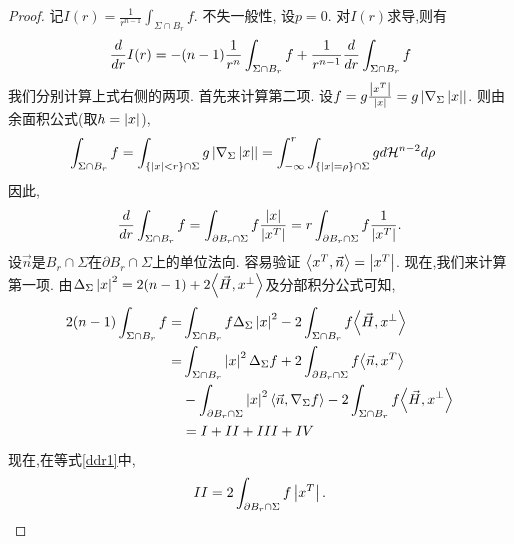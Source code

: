 \begin{proof}
     记$I(r)=\frac{1}{r^{n-1}}\int_{\Sigma\cap B_r} f$. 不失一般性, 设$p=0$. 对$I(r)$求导,则有
     \begin{equation} \label{ddr}
        \frac{d}{dr} I(r)=-(n-1)\frac{1}{r^n}\int_{\Sigma \cap B_r} f + \frac{1}{r^{n-1}}\frac{d}{dr} \int_{\Sigma \cap B_r} f
     \end{equation}
     我们分别计算上式右侧的两项. 首先来计算第二项. 设$f=g\frac{\left | x^T \right |}{\left | x \right |}=g\left | \nabla_\Sigma \left | x \right | \right |$. 则由余面积公式(取$h=\left | x \right |$),
     \begin{equation}
        \begin{split}
            \int_{\Sigma \cap B_r} f = \int_{\{\left | x \right | < r\}\cap \Sigma }g \left | \nabla_\Sigma \left | x \right | \right | &= \int^r_{-\infty} \int_{\{\left | x \right |=\rho\} \cap \Sigma} g d{{\mathcal{H}}}^{n-2}d\rho 
        \end{split}
     \end{equation}
     因此, 
     \begin{equation} \label{ddr2}
        \frac{d}{dr} \int_{\Sigma \cap B_r} f= \int_{\partial B_r \cap \Sigma} f \frac{\left | x \right |}{\left | x^T \right |} =r\int_{\partial B_r\cap \Sigma} f \frac{1}{\left | x^T \right |}.
     \end{equation}
     设$\vec{n}$是$B_r\cap \Sigma$在$\partial B_r\cap \Sigma$上的单位法向. 容易验证 ${\left < x^T, \vec{n} \right >}= \left | x^T \right |$.  现在,我们来计算第一项. 由$\Delta_\Sigma \left | x \right |^2=2(n-1)+2{\left < \vec{H}, x^\perp \right >}$及分部积分公式可知,
     \begin{equation} \label{ddr1}
        \begin{split}
            2(n-1)\int_{\Sigma \cap B_r}f =&\int_{\Sigma \cap B_r}f \Delta_{\Sigma}\left | x \right |^2-2\int_{\Sigma \cap B_r} f{\left < \vec{H}, x^\perp \right >} \\
            =& \int_{\Sigma \cap B_r}\left | x \right |^2 \Delta_\Sigma f + 2\int_{\partial B_r\cap \Sigma}f{\left < \vec{n}, x^T \right >}  \\
            &- \int_{\partial B_r \cap \Sigma}\left | x \right |^2 {\left < \vec{n}, \nabla_{\Sigma}f \right >}-2\int_{\Sigma \cap B_r} f{\left < \vec{H}, x^\perp \right >}\\
            &=I+II+III+IV
        \end{split}
     \end{equation}
     现在,在等式\eqref{ddr1}中,
     \begin{equation}
        II=2\int_{\partial B_r\cap \Sigma}f\left | x^T \right |.
     \end{equation}
     \begin{equation}

\end{equation}
\end{proof}
